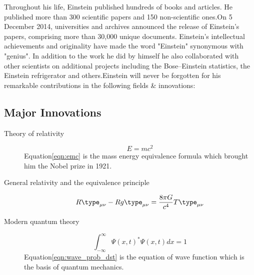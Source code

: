 \documentclass{article}
\begin{document}
Throughout his life, Einstein published hundreds of books and articles. He published more than 300 scientific papers and 150 non-scientific ones.On 5 December 2014, universities and archives announced the release of Einstein's papers, comprising more than 30,000 unique documents. Einstein's intellectual achievements and originality have made the word "Einstein" synonymous with "genius". In addition to the work he did by himself he also collaborated with other scientists on additional projects including the Bose–Einstein statistics, the Einstein refrigerator and others.Einstein will never be forgotten for his remarkable contributions in the following fields \& innovations:

\newpage
\subsection{Major Innovations}
\begin{description}

\item[Theory of relativity]
\begin{equation}
    E = mc^2
\label{eqn:emc}
\end{equation}
Equation\eqref{eqn:emc} is the mass energy equivalence formula which brought him the Nobel prize in 1921.

\item [General relativity and the equivalence principle]
\begin{equation*}
    R \type_{\mu \nu} - R g \type_{\mu \nu} = \frac{8 \pi G}{c^4} T \type_{\mu \nu}
\end{equation*}

\item [Modern quantum theory]
\begin{equation}
     \int_{-\infty}^{\infty} \Psi (x,t)^ * \Psi (x,t) dx = 1 
    \label{eqn:wave_prob_dst}
\end{equation}
    Equation\eqref{eqn:wave_prob_dst} is the equation of wave function which is the basis of quantum mechanics.
\end{description}
\end{document}
